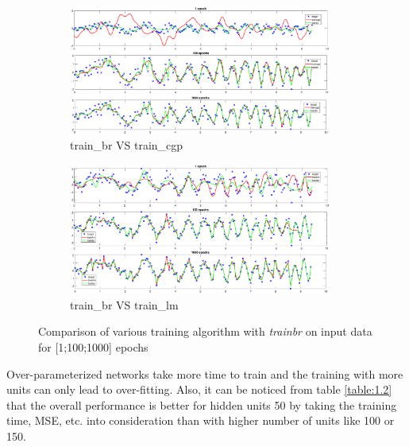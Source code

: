 \begin{figure}[!htpb]
\begin{subfigure}[b]{0.5\textwidth}
		\centering
		\captionsetup{width=0.8\linewidth, format = hang}
		\includegraphics[height = 0.7\textwidth,width = 0.95\textwidth]{Exercise1/Report/train_br_cgp}
		\caption{train\_br VS  train\_cgp}\label{fig:train_br_cgp}
	\end{subfigure}%
	\begin{subfigure}[b]{0.5\textwidth}
		\centering
		\captionsetup{width=0.8\linewidth, format = hang}
		\includegraphics[height = 0.7\textwidth,width = 0.95\textwidth]{Exercise1/Report/train_br_lm}
		\caption{train\_br VS  train\_lm}\label{fig:train_br_lm}
	\end{subfigure}
	\captionsetup{format = hang}
	\caption{Comparison of various training algorithm with \textit{trainbr} on input data for [1;100;1000] epochs}
	\label{fig:train_br}
\end{figure}

Over-parameterized networks take more time to train and the training with more units can only lead to over-fitting. Also, it can be noticed from table \ref{table:1.2} that the overall performance is better for hidden units 50 by taking the training time, MSE, etc. into consideration than with higher number of units like 100 or 150.  